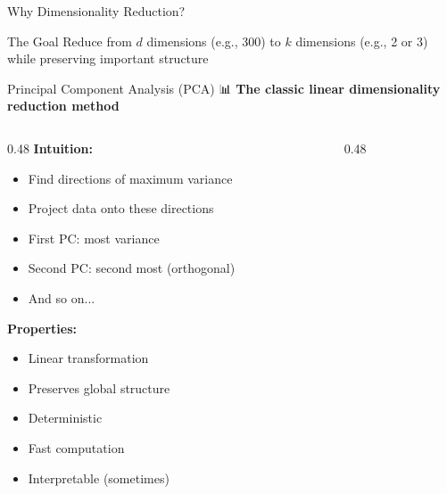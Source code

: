 \documentclass[aspectratio=169]{beamer}
\begin{document}
\begin{frame}[shrink=10]{Why Dimensionality Reduction? 🎯}
\vspace{1em}

\begin{block}{The Goal}
Reduce from $d$ dimensions (e.g., 300) to $k$ dimensions (e.g., 2 or 3) while \alert{preserving important structure}
\end{block}
\end{frame}

\begin{frame}[shrink=10]{Principal Component Analysis (PCA) 📊}
\textbf{The classic linear dimensionality reduction method}

\vspace{1em}

\begin{columns}[T]
\begin{column}{0.48\textwidth}
\textbf{Intuition:}
\begin{itemize}\setlength{\itemsep}{0pt}
    \item Find directions of maximum variance
    \item Project data onto these directions
    \item First PC: most variance
    \item Second PC: second most (orthogonal)
    \item And so on...
\end{itemize}

\vspace{0.5em}
\textbf{Properties:}
\begin{itemize}\setlength{\itemsep}{0pt}
    \item Linear transformation
    \item Preserves global structure
    \item Deterministic
    \item Fast computation
    \item Interpretable (sometimes)
\end{itemize}
\end{column}

\begin{column}{0.48\textwidth}
\begin{center}
\end{center}
\end{column}
\end{columns}
\end{frame}
\end{document}
